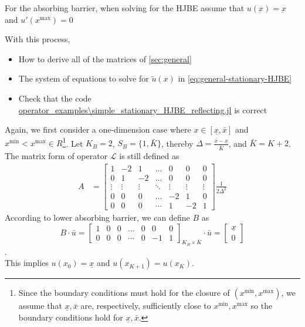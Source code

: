 \documentclass[11pt]{article}
\begin{document}
For the absorbing barrier, when solving for the HJBE assume that $u(\underbar{x}) = \underbar{x}$ and $u'(x^{\max}) = 0$


With this process,
\begin{itemize}
	\item How to derive all of the matrices of \cref{sec:general}
	\item The system of equations to solve for $\tilde{u}(x)$ in \cref{eq:general-stationary-HJBE}
	\item Check that the code \url{operator_examples\simple_stationary_HJBE_reflecting.jl} is correct
\end{itemize}

Again, we first consider a one-dimension case where $x\in [\underline{\textit{\~{x}}}, \bar{\textit{\~{x}}}]$ and $x^{\min} < x^{\max} \in R$\footnote{Since the boundary conditions must hold for the closure of $(x^{\min},x^{\max})$, we assume that $\underline{\textit{\~{x}}}, \bar{\textit{\~{x}}}$ are, respectively, sufficiently close to $x^{\min}, x^{\max}$ so the boundary conditions hold for $\underline{\textit{\~{x}}}, \bar{\textit{\~{x}}}$.}. Let $K_B = 2$, $S_B = \{1,\bar{K}\}$, thereby $\Delta  = \frac{\bar{\textit{\~{x}}}-\underline{\textit{\~{x}}}}{\bar{K}}$, and $\bar{K} = K+2$. The matrix form of operator $\mathcal{L}$ is still defined as
\begin{align}
A &= \begin{bmatrix}
1&-2&1&\dots&0&0&0\\
0&1&-2&\dots&0&0&0\\
\vdots&\vdots&\vdots&\ddots&\vdots&\vdots&\vdots\\
0&0&0&\dots&-2&1&0\\
0&0&0&\cdots&1&-2&1
\end{bmatrix}\frac{1}{2\Delta^{2}}
\end{align}
According to lower absorbing barrier, we can define $B$ as
\begin{equation}
B\cdot\bar{u} =\begin{bmatrix}
1&0&0&\dots&0&0&0\\
0&0&0&\cdots&0&-1&1
\end{bmatrix}_{K_B\times \bar{K}}\cdot\bar{u} = \begin{bmatrix}
\underline{\textit{\~{x}}}\\
0
\end{bmatrix}
\end{equation}.\\
This implies $u(x_0) = \underline{\textit{\~{x}}}$ and $u(x_{K+1}) = u(x_K)$.\\
\end{document}
